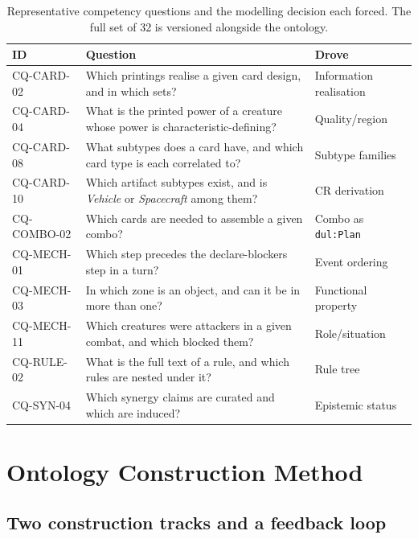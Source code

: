 \documentclass[11pt,a4paper]{article}
\begin{document}
\begin{table}[t]
\centering
\small
\setlength{\tabcolsep}{4pt}
\begin{tabularx}{\linewidth}{lXl}
\toprule
\textbf{ID} & \textbf{Question} & \textbf{Drove} \\
\midrule
CQ-CARD-02 & Which printings realise a given card design, and in which sets? & Information realisation \\
CQ-CARD-04 & What is the printed power of a creature whose power is characteristic-defining? & Quality/region \\
CQ-CARD-08 & What subtypes does a card have, and which card type is each correlated to? & Subtype families \\
CQ-CARD-10 & Which artifact subtypes exist, and is \emph{Vehicle} or \emph{Spacecraft} among them? & CR derivation \\
CQ-COMBO-02 & Which cards are needed to assemble a given combo? & Combo as \texttt{dul:Plan} \\
CQ-MECH-01 & Which step precedes the declare-blockers step in a turn? & Event ordering \\
CQ-MECH-03 & In which zone is an object, and can it be in more than one? & Functional property \\
CQ-MECH-11 & Which creatures were attackers in a given combat, and which blocked them? & Role/situation \\
CQ-RULE-02 & What is the full text of a rule, and which rules are nested under it? & Rule tree \\
CQ-SYN-04 & Which synergy claims are curated and which are induced? & Epistemic status \\
\bottomrule
\end{tabularx}
\caption{Representative competency questions and the modelling decision each forced. The full set of 32 is versioned alongside the ontology.}
\label{tab:cqs}
\end{table}

\section{Ontology Construction Method}
\label{sec:construction}

\subsection{Two construction tracks and a feedback loop}
\end{document}
